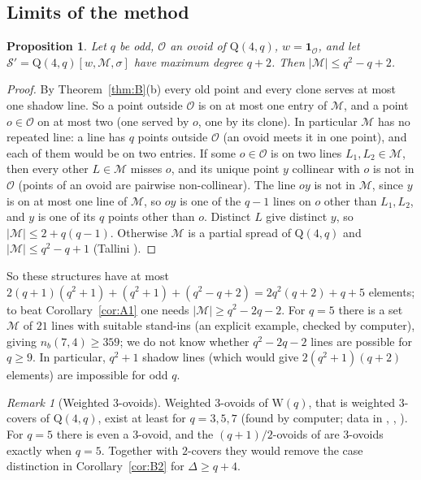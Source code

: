 \documentclass[11pt]{amsart}
\newtheorem{proposition}[theorem]{Proposition}
\theoremstyle{definition}
\theoremstyle{remark}
\newtheorem{remark}[theorem]{Remark}
\newcommand{\cS}{\mathcal{S}}
\newcommand{\cO}{\mathcal{O}}
\newcommand{\cM}{\mathcal{M}}
\newcommand{\Wq}{\mathrm{W}}
\newcommand{\Qf}{\mathrm{Q}}
\begin{document}
\subsection{Limits of the method}
\begin{proposition}\label{prop:shadowbound}
Let $q$ be odd, $\cO$ an ovoid of $\Qf(4,q)$, $w=\mathbf 1_\cO$, and let $\cS'=\Qf(4,q)[w,\cM,\sigma]$ have maximum degree $q+2$. Then $|\cM|\le q^2-q+2$.
\end{proposition}

\begin{proof}
By Theorem~\ref{thm:B}(b) every old point and every clone serves at most one shadow line. So a point outside $\cO$ is on at most one entry of $\cM$, and a point $o\in\cO$ on at most two (one served by $o$, one by its clone). In particular $\cM$ has no repeated line: a line has $q$ points outside $\cO$ (an ovoid meets it in one point), and each of them would be on two entries. If some $o\in\cO$ is on two lines $L_1,L_2\in\cM$, then every other $L\in\cM$ misses $o$, and its unique point $y$ collinear with $o$ is not in $\cO$ (points of an ovoid are pairwise non-collinear). The line $oy$ is not in $\cM$, since $y$ is on at most one line of $\cM$, so $oy$ is one of the $q-1$ lines on $o$ other than $L_1,L_2$, and $y$ is one of its $q$ points other than $o$. Distinct $L$ give distinct $y$, so $|\cM|\le2+q(q-1)$. Otherwise $\cM$ is a partial spread of $\Qf(4,q)$ and $|\cM|\le q^2-q+1$ (Tallini \cite{Tal91}).
\end{proof}

So these structures have at most $2(q+1)(q^2+1)+(q^2+1)+(q^2-q+2)=2q^2(q+2)+q+5$ elements; to beat Corollary~\ref{cor:A1} one needs $|\cM|\ge q^2-2q-2$. For $q=5$ there is a set $\cM$ of $21$ lines with suitable stand-ins (an explicit example, checked by computer), giving $n_b(7,4)\ge359$; we do not know whether $q^2-2q-2$ lines are possible for $q\ge9$. In particular, $q^2+1$ shadow lines (which would give $2(q^2+1)(q+2)$ elements) are impossible for odd $q$.

\begin{remark}[Weighted $3$-ovoids]
Weighted $3$-ovoids of $\Wq(q)$, that is weighted $3$-covers of $\Qf(4,q)$, exist at least for $q=3,5,7$ (found by computer; data in , , ). For $q=5$ there is even a $3$-ovoid, and the $(q+1)/2$-ovoids of \cite{BLP09} are $3$-ovoids exactly when $q=5$. Together with $2$-covers they would remove the case distinction in Corollary~\ref{cor:B2} for $\Delta\ge q+4$.
\end{remark}
\end{document}
